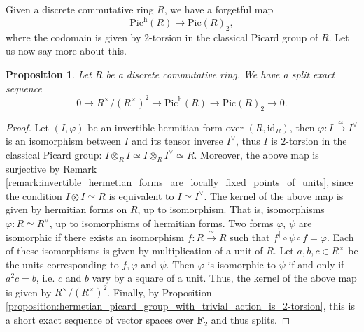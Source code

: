 \documentclass{article}
\newtheorem{proposition}[equation]{Proposition}
\theoremstyle{definition}
\begin{document}
Given a discrete commutative ring $R$, we have a forgetful map $$\text{Pic}^\text{h}(R)\rightarrow \text{Pic}(R)_2,$$where the codomain is given by $2$-torsion in the classical Picard group of $R$. Let us now say more about this.

\begin{proposition}
    \label{proposition:split_exact_sequence_for_hermetian_picard_group_with_trivial_action}
    Let $R$ be a discrete commutative ring. We have a split exact sequence $$0\rightarrow R^\times/(R^\times)^2\rightarrow\text{Pic}^\text{h}(R)\rightarrow \text{Pic}(R)_2\rightarrow 0.$$
\end{proposition}

\begin{proof}
    \label{proof:split_exact_sequence_for_hermetian_picard_group_with_trivial_action}
    Let $(I,\varphi)$ be an invertible hermitian form over $(R,\text{id}_R)$, then $\varphi:I\xrightarrow{\simeq} I^\vee$ is an isomorphism between $I$ and its tensor inverse $I^\vee$, thus $I$ is $2$-torsion in the classical Picard group: $I\otimes_R I\simeq I\otimes_R I^\vee\simeq R$. Moreover, the above map is surjective by Remark \ref{remark:invertible_hermetian_forms_are_locally_fixed_points_of_units}, since the condition $I\otimes I\simeq R$ is equivalent to $I\simeq I^\vee$. The kernel of the above map is given by hermitian forms on $R$, up to isomorphism. That is, isomorphisms $\varphi: R\simeq R^\vee$, up to isomorphisms of hermitian forms. Two forms $\varphi$, $\psi$ are isomorphic if there exists an isomorphism $f:R\xrightarrow{\simeq} R$ such that $f^\dagger\circ\psi\circ f=\varphi$. Each of these isomorphisms is given by multiplication of a unit of $R$. Let $a,b,c\in R^\times$ be the units corresponding to $f, \varphi$ and $\psi$. Then $\varphi$ is isomorphic to $\psi$ if and only if $a^2c=b$, i.e. $c$ and $b$ vary by a square of a unit. Thus, the kernel of the above map is given by $R^\times/(R^\times)^2$. Finally, by Proposition \ref{proposition:hermetian_picard_group_with_trivial_action_is_2-torsion}, this is a short exact sequence of vector spaces over $\mathbf{F}_2$ and thus splits.
\end{proof}
\end{document}
